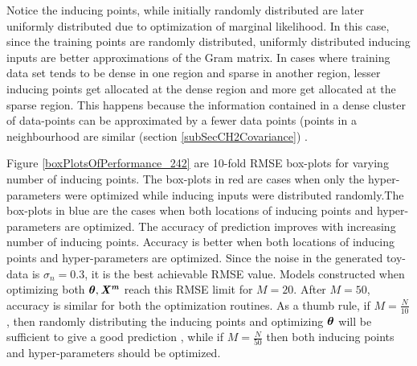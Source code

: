 Notice the inducing points, while initially randomly distributed are later uniformly distributed due to optimization of marginal likelihood. In this case, since the training points are randomly distributed, uniformly distributed inducing inputs are better approximations of the Gram matrix. In cases where training data set tends to be dense in one region and sparse in another region, lesser inducing points get allocated at the dense region and more get allocated at the sparse region. This happens because the information contained in a dense cluster of data-points can be approximated by a fewer data points (points in a neighbourhood are similar (section \ref{subSecCH2Covariance}) \cite{Snelson06sparsegaussian}.

Figure \ref{boxPlotsOfPerformance_242} are 10-fold RMSE box-plots for varying number of inducing points. The box-plots in red are cases when only the hyper-parameters were optimized while inducing inputs were distributed randomly.The box-plots in blue are the cases when both locations of inducing points and hyper-parameters are optimized. The accuracy of prediction improves with increasing number of inducing points. Accuracy is better when both locations of inducing points and hyper-parameters are optimized. Since the noise in the generated toy-data is $\sigma_{n}=0.3$, it is the best achievable RMSE value. Models constructed when optimizing both $\boldsymbol{\theta}, \bm{\mathit{X^{m}}}$ reach this RMSE limit for $M = 20$. After $M=50$, accuracy is similar for both the optimization routines. As a thumb rule, if $M = \frac{N}{10}$, then randomly distributing the inducing points and optimizing $\boldsymbol{\theta}$ will be sufficient to give a good prediction \cite{cao2013efficient}, while if $M = \frac{N}{50}$ then both inducing points and hyper-parameters should be optimized. 

